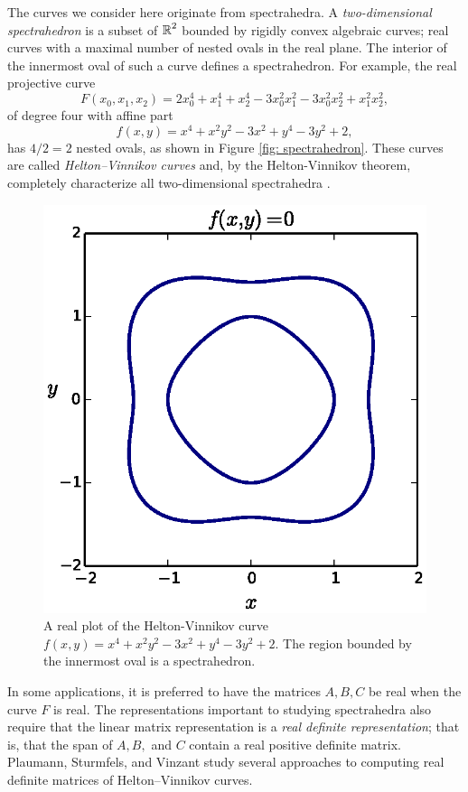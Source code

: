 The curves we consider here originate from spectrahedra. A {\it
  two-dimensional spectrahedron} is a subset of $\operatorname{\mathbb{R}}^2$ bounded by
rigidly convex algebraic curves; real curves with a maximal number of
nested ovals in the real plane. The interior of the innermost oval of
such a curve defines a spectrahedron. For example, the real projective
curve
\[
    F(x_0,x_1,x_2) =
    2x_0^4 + x_1^4 + x_2^4 - 3x_0^2x_1^2 - 3x_0^2x_2^2 + x_1^2x_2^2,
\]
of degree four with affine part
\[
    f(x,y) = x^{4} + x^{2} y^{2} - 3 x^{2} + y^{4} - 3 y^{2} + 2,
\]
has $4/2 = 2$ nested ovals, as shown in Figure \ref{fig:
  spectrahedron}. These curves are called {\it Helton--Vinnikov curves}
and, by the Helton-Vinnikov theorem, completely characterize all
two-dimensional spectrahedra \cite{HeltonVinnikov07}.

\begin{figure}[t]
  \centering
  \includegraphics[width=\textwidth]{images/heltonvinnikov.eps}
  \caption{A real plot of the Helton-Vinnikov curve $f(x,y) = x^{4} +
    x^{2} y^{2} - 3 x^{2} + y^{4} - 3 y^{2} + 2$. The region bounded by
    the innermost oval is a spectrahedron.}
  \label{fig: spectrahedron}
\end{figure}

In some applications, it is preferred to have the matrices $A,B,C$ be
real when the curve $F$ is real. The representations important to
studying spectrahedra also require that the linear matrix representation
is a {\it real definite representation}; that is, that the span of
$A,B,$ and $C$ contain a real positive definite matrix. Plaumann,
Sturmfels, and Vinzant \cite{PSV10} study several approaches to
computing real definite matrices of Helton--Vinnikov curves.

